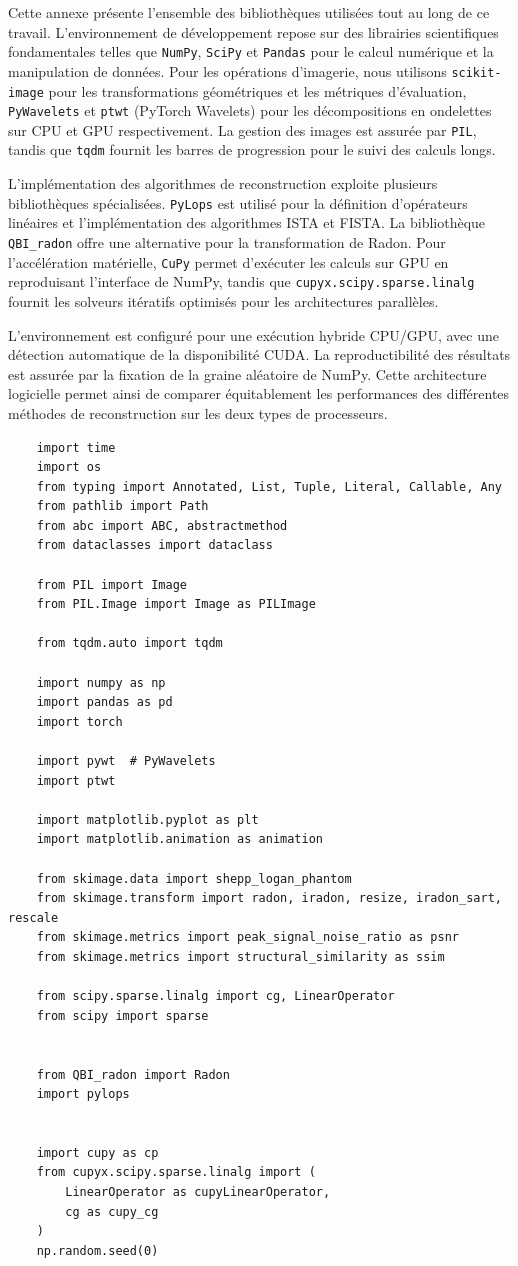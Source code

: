 \appendix
Cette annexe présente l'ensemble des bibliothèques utilisées tout au long de ce travail. L'environnement de développement repose sur des librairies scientifiques fondamentales telles que \texttt{NumPy}, \texttt{SciPy} et \texttt{Pandas} pour le calcul numérique et la manipulation de données. Pour les opérations d'imagerie, nous utilisons \texttt{scikit-image} pour les transformations géométriques et les métriques d'évaluation, \texttt{PyWavelets} et \texttt{ptwt} (PyTorch Wavelets) pour les décompositions en ondelettes sur CPU et GPU respectivement. La gestion des images est assurée par \texttt{PIL}, tandis que \texttt{tqdm} fournit les barres de progression pour le suivi des calculs longs.

L'implémentation des algorithmes de reconstruction exploite plusieurs bibliothèques spécialisées. \texttt{PyLops} est utilisé pour la définition d'opérateurs linéaires et l'implémentation des algorithmes ISTA et FISTA. La bibliothèque \texttt{QBI\_radon} offre une alternative pour la transformation de Radon. Pour l'accélération matérielle, \texttt{CuPy} permet d'exécuter les calculs sur GPU en reproduisant l'interface de NumPy, tandis que \texttt{cupyx.scipy.sparse.linalg} fournit les solveurs itératifs optimisés pour les architectures parallèles.

L'environnement est configuré pour une exécution hybride CPU/GPU, avec une détection automatique de la disponibilité CUDA. La reproductibilité des résultats est assurée par la fixation de la graine aléatoire de NumPy. Cette architecture logicielle permet ainsi de comparer équitablement les performances des différentes méthodes de reconstruction sur les deux types de processeurs.

\begin{verbatim}
    import time
    import os
    from typing import Annotated, List, Tuple, Literal, Callable, Any
    from pathlib import Path
    from abc import ABC, abstractmethod
    from dataclasses import dataclass

    from PIL import Image
    from PIL.Image import Image as PILImage

    from tqdm.auto import tqdm

    import numpy as np
    import pandas as pd
    import torch

    import pywt  # PyWavelets
    import ptwt

    import matplotlib.pyplot as plt
    import matplotlib.animation as animation

    from skimage.data import shepp_logan_phantom
    from skimage.transform import radon, iradon, resize, iradon_sart, rescale
    from skimage.metrics import peak_signal_noise_ratio as psnr
    from skimage.metrics import structural_similarity as ssim

    from scipy.sparse.linalg import cg, LinearOperator
    from scipy import sparse


    from QBI_radon import Radon
    import pylops


    import cupy as cp
    from cupyx.scipy.sparse.linalg import (
        LinearOperator as cupyLinearOperator,
        cg as cupy_cg
    )
    np.random.seed(0)
\end{verbatim}

